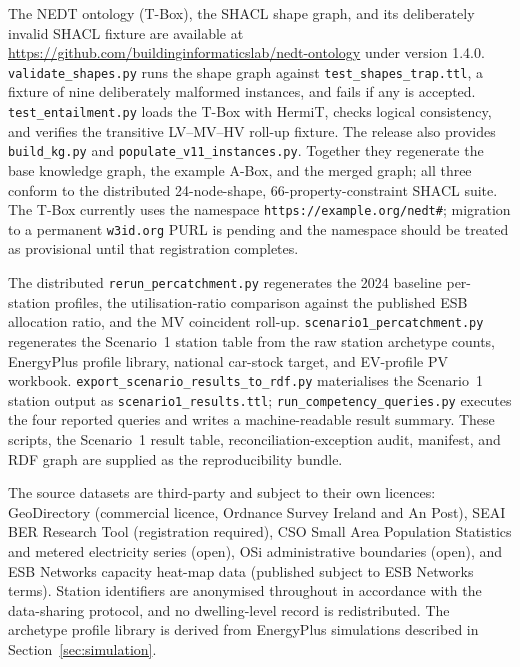 \documentclass[preprint,12pt]{elsarticle}
\begin{document}
The NEDT ontology (T-Box), the SHACL shape graph, and its deliberately
invalid SHACL fixture are
available at
\url{https://github.com/buildinginformaticslab/nedt-ontology} under version
1.4.0. \texttt{validate\_shapes.py} runs the shape graph against
\texttt{test\_shapes\_trap.ttl}, a fixture of nine deliberately malformed
instances, and fails if any is accepted.
\texttt{test\_entailment.py} loads the T-Box with HermiT, checks logical
consistency, and verifies the transitive LV--MV--HV roll-up fixture.
The release also provides \texttt{build\_kg.py} and
\texttt{populate\_v11\_instances.py}. Together they regenerate the base
knowledge graph, the example A-Box, and the merged graph; all three conform
to the distributed 24-node-shape, 66-property-constraint SHACL suite.
The T-Box currently uses the namespace
\texttt{https://example.org/nedt\#}; migration to a permanent
\texttt{w3id.org} PURL is pending and the namespace should be treated as
provisional until that registration completes.

The distributed \texttt{rerun\_percatchment.py} regenerates the 2024
baseline per-station profiles, the utilisation-ratio comparison against the
published ESB allocation ratio, and the MV coincident roll-up.
\texttt{scenario1\_percatchment.py} regenerates the Scenario~1 station table
from the raw station archetype counts, EnergyPlus profile library, national
car-stock target, and EV-profile PV workbook.
\texttt{export\_scenario\_results\_to\_rdf.py} materialises the
Scenario~1 station output as \texttt{scenario1\_results.ttl};
\texttt{run\_competency\_queries.py} executes the four reported queries and
writes a machine-readable result summary. These scripts, the Scenario~1
result table, reconciliation-exception audit, manifest, and RDF graph are
supplied as the reproducibility bundle.

The source datasets are third-party and subject to their own licences:
GeoDirectory (commercial licence, Ordnance Survey Ireland and An Post), SEAI
BER Research Tool (registration required), CSO Small Area Population
Statistics and metered electricity series (open), OSi administrative
boundaries (open), and ESB Networks capacity heat-map data (published
subject to ESB Networks terms). Station identifiers are anonymised
throughout in accordance with the data-sharing protocol, and no
dwelling-level record is redistributed. The archetype profile library is
derived from EnergyPlus simulations described in
Section~\ref{sec:simulation}.

\newpage


\end{document}
